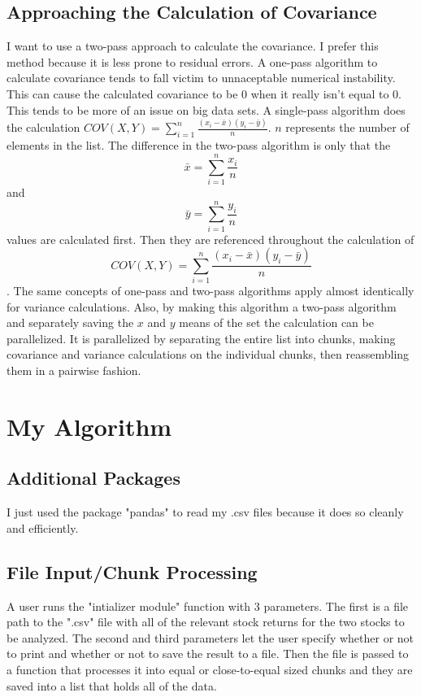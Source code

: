 \documentclass{article}
\begin{document}
     \subsection{Approaching the Calculation of Covariance}
     I want to use a two-pass approach to calculate the covariance. I prefer this method because it is less prone to residual errors. A one-pass algorithm to calculate covariance tends to fall victim to unnaceptable numerical instability. This can cause the calculated covariance to be $0$ when it really isn't equal to $0$. This tends to be more of an issue on big data sets. A single-pass algorithm does the calculation $COV(X,Y) = \sum\limits_{i=1}^n \frac{(x_i - \bar{x})(y_i - \bar{y})}{n}$. $n$ represents the number of elements in the list. The difference in the two-pass algorithm is only that the $$\bar{x} = \sum\limits_{i=1}^n \frac{x_i}{n}$$ and $$\bar{y} = \sum\limits_{i=1}^n \frac{y_i}{n}$$ values are calculated first. Then they are referenced throughout the calculation of \label{second-comoment}$$COV(X,Y) = \sum\limits_{i=1}^n \frac{(x_i - \bar{x})(y_i - \bar{y})}{n}$$. The same concepts of one-pass and two-pass algorithms apply almost identically for variance calculations. Also, by making this algorithm a two-pass algorithm and separately saving the $x$ and $y$ means of the set the calculation can be parallelized. It is parallelized by separating the entire list into chunks, making covariance and variance calculations on the individual chunks, then reassembling them in a pairwise fashion. \cite{pairwise}
     

 \section{My Algorithm}
     
     \subsection{Additional Packages}
I just used the package "pandas" to read my .csv files because it does so cleanly and efficiently.

     \subsection{File Input/Chunk Processing}
A user runs the "intializer module" function with 3 parameters. The first is a file path to the ".csv" file with all of the relevant stock returns for the two stocks to be analyzed. The second and third parameters let the user specify whether or not to print and whether or not to save the result to a file. Then the file is passed to a function that processes it into equal or close-to-equal sized chunks and they are saved into a list that holds all of the data.
\end{document}
